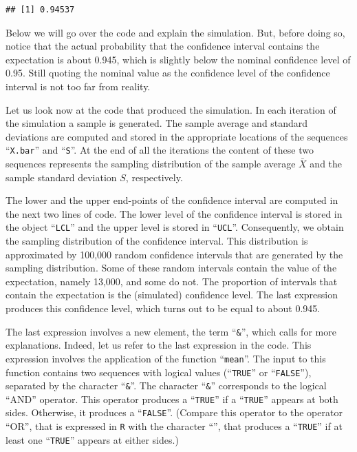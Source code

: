 \documentclass[]{krantz}
\theoremstyle{definition}
\theoremstyle{definition}
\theoremstyle{definition}
\theoremstyle{remark}
\begin{document}
\begin{verbatim}
## [1] 0.94537
\end{verbatim}

Below we will go over the code and explain the simulation. But, before
doing so, notice that the actual probability that the confidence
interval contains the expectation is about 0.945, which is slightly
below the nominal confidence level of 0.95. Still quoting the nominal
value as the confidence level of the confidence interval is not too far
from reality.

Let us look now at the code that produced the simulation. In each
iteration of the simulation a sample is generated. The sample average
and standard deviations are computed and stored in the appropriate
locations of the sequences ``\texttt{X.bar}'' and ``\texttt{S}''. At the end of all the
iterations the content of these two sequences represents the sampling
distribution of the sample average \(\bar X\) and the sample standard
deviation \(S\), respectively.

The lower and the upper end-points of the confidence interval are
computed in the next two lines of code. The lower level of the
confidence interval is stored in the object ``\texttt{LCL}'' and the upper level
is stored in ``\texttt{UCL}''. Consequently, we obtain the sampling distribution
of the confidence interval. This distribution is approximated by 100,000
random confidence intervals that are generated by the sampling
distribution. Some of these random intervals contain the value of the
expectation, namely 13,000, and some do not. The proportion of intervals
that contain the expectation is the (simulated) confidence level. The
last expression produces this confidence level, which turns out to be
equal to about 0.945.

The last expression involves a new element, the term ``\texttt{\&}'', which calls
for more explanations. Indeed, let us refer to the last expression in
the code. This expression involves the application of the function
``\texttt{mean}''. The input to this function contains two sequences with logical
values (``\texttt{TRUE}'' or ``\texttt{FALSE}''), separated by the character ``\texttt{\&}''. The
character ``\texttt{\&}'' corresponds to the logical ``AND'' operator. This operator
produces a ``\texttt{TRUE}'' if a ``\texttt{TRUE}'' appears at both sides. Otherwise, it
produces a ``\texttt{FALSE}''. (Compare this operator to the operator ``OR'', that
is expressed in \texttt{R} with the character ``\texttt{\textbar{}}'', that produces a ``\texttt{TRUE}''
if at least one ``\texttt{TRUE}'' appears at either sides.)
\end{document}
